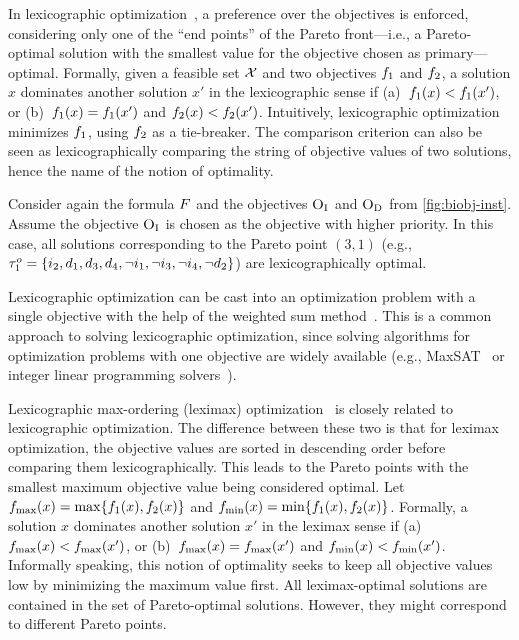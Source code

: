 In lexicographic optimization~\autocite{Ehrgott2005-5}, a preference over the objectives is enforced, considering only one of the ``end points'' of the Pareto front---i.e., a Pareto-optimal solution with the smallest value for the objective chosen as primary---optimal.
Formally, given a feasible set $\mathcal{X}$ and two objectives $f_1$ and $f_2$, a solution $x$ dominates another solution $x'$ in the lexicographic sense if (a)~$f_1(x) < f_1(x')$, or (b)~$f_1(x) = f_1(x')$ and $f_2(x) < f_2(x')$.
Intuitively, lexicographic optimization minimizes $f_1$, using $f_2$ as a tie-breaker.
The comparison criterion can also be seen as lexicographically comparing the string of objective values of two solutions, hence the name of the notion of optimality.

\begin{example}
  Consider again the formula $F$ and the objectives $\textsc{O}_{\text{I}}$ and $\textsc{O}_{\text{D}}$ from \cref{fig:biobj-inst}.
  Assume the objective $\textsc{O}_{\text{I}}$ is chosen as the objective with higher priority.
  In this case, all solutions corresponding to the Pareto point $(3,1)$ (e.g., $\tau^o_1 = \{i_2,\allowbreak d_1,\allowbreak d_3,\allowbreak d_4,\allowbreak \lnot i_1,\allowbreak \lnot i_3,\allowbreak \lnot i_4,\allowbreak \lnot d_2\}$) are lexicographically optimal.
\end{example}

Lexicographic optimization can be cast into an optimization problem with a single objective with the help of the weighted sum method~\autocite{Ehrgott2005-3}.
This is a common approach to solving lexicographic optimization, since solving algorithms for optimization problems with one objective are widely available (e.g., MaxSAT~\autocite{handbook2-maxsat} or integer linear programming solvers~\autocite{ChenEtAl2010-intro}).

Lexicographic max-ordering (leximax) optimization~\autocite{Ehrgott2005-5} is closely related to lexicographic optimization.
The difference between these two is that for leximax optimization, the objective values are sorted in descending order before comparing them lexicographically.
This leads to the Pareto points with the smallest maximum objective value being considered optimal.
Let $f_\text{max}(x) = \max\{f_1(x), f_2(x)\}$ and $f_\text{min}(x) = \min\{f_1(x), f_2(x)\}$.
Formally, a solution $x$ dominates another solution $x'$ in the leximax sense if (a)~$f_\text{max}(x) < f_\text{max}(x')$, or (b)~$f_\text{max}(x) = f_\text{max}(x')$ and $f_\text{min}(x) < f_\text{min}(x')$.
Informally speaking, this notion of optimality seeks to keep all objective values low by minimizing the maximum value first.
All leximax-optimal solutions are contained in the set of Pareto-optimal solutions.
However, they might correspond to different Pareto points.

